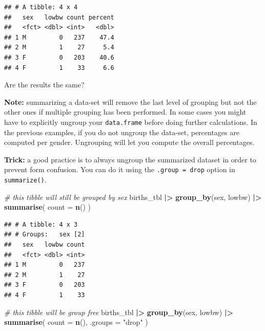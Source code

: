 \documentclass[
]{book}
\newenvironment{Shaded}{\begin{snugshade}}{\end{snugshade}}
\newcommand{\AttributeTok}[1]{\textcolor[rgb]{0.13,0.29,0.53}{#1}}
\newcommand{\CommentTok}[1]{\textcolor[rgb]{0.56,0.35,0.01}{\textit{#1}}}
\newcommand{\FunctionTok}[1]{\textcolor[rgb]{0.13,0.29,0.53}{\textbf{#1}}}
\newcommand{\NormalTok}[1]{#1}
\newcommand{\SpecialCharTok}[1]{\textcolor[rgb]{0.81,0.36,0.00}{\textbf{#1}}}
\newcommand{\StringTok}[1]{\textcolor[rgb]{0.31,0.60,0.02}{#1}}
\theoremstyle{definition}
\theoremstyle{definition}
\theoremstyle{definition}
\theoremstyle{definition}
\theoremstyle{remark}
\begin{document}
\begin{verbatim}
## # A tibble: 4 x 4
##   sex   lowbw count percent
##   <fct> <dbl> <int>   <dbl>
## 1 M         0   237    47.4
## 2 M         1    27     5.4
## 3 F         0   203    40.6
## 4 F         1    33     6.6
\end{verbatim}

Are the results the same?

\textbf{Note:} summarizing a data-set will remove the last level of grouping but not the other ones if multiple grouping has been performed. In some cases you might have to explicitly ungroup your \texttt{data.frame} before doing further calculations.
In the previous examples, if you do not ungroup the data-set, percentages are computed per gender. Ungrouping will let you compute the overall
percentages.

\textbf{Trick:} a good practice is to always ungroup the summarized dataset in order to prevent form confusion. You can do it using the \texttt{.group\ =\ \textquotesingle{}drop\textquotesingle{}} option in \texttt{summarize()}.

\begin{Shaded}
\begin{Highlighting}[]
\CommentTok{\# this tibble will still be grouped by sex}
\NormalTok{births\_tbl }\SpecialCharTok{|\textgreater{}}
  \FunctionTok{group\_by}\NormalTok{(sex, lowbw) }\SpecialCharTok{|\textgreater{}}
  \FunctionTok{summarise}\NormalTok{(}
    \AttributeTok{count =} \FunctionTok{n}\NormalTok{()}
\NormalTok{  )}
\end{Highlighting}
\end{Shaded}

\begin{verbatim}
## # A tibble: 4 x 3
## # Groups:   sex [2]
##   sex   lowbw count
##   <fct> <dbl> <int>
## 1 M         0   237
## 2 M         1    27
## 3 F         0   203
## 4 F         1    33
\end{verbatim}

\begin{Shaded}
\begin{Highlighting}[]
\CommentTok{\# this tibble will be group free}
\NormalTok{births\_tbl }\SpecialCharTok{|\textgreater{}}
  \FunctionTok{group\_by}\NormalTok{(sex, lowbw) }\SpecialCharTok{|\textgreater{}}
  \FunctionTok{summarise}\NormalTok{(}
    \AttributeTok{count =} \FunctionTok{n}\NormalTok{(),}
    \AttributeTok{.groups =} \StringTok{"drop"}
\NormalTok{  )}
\end{Highlighting}
\end{Shaded}
\end{document}
